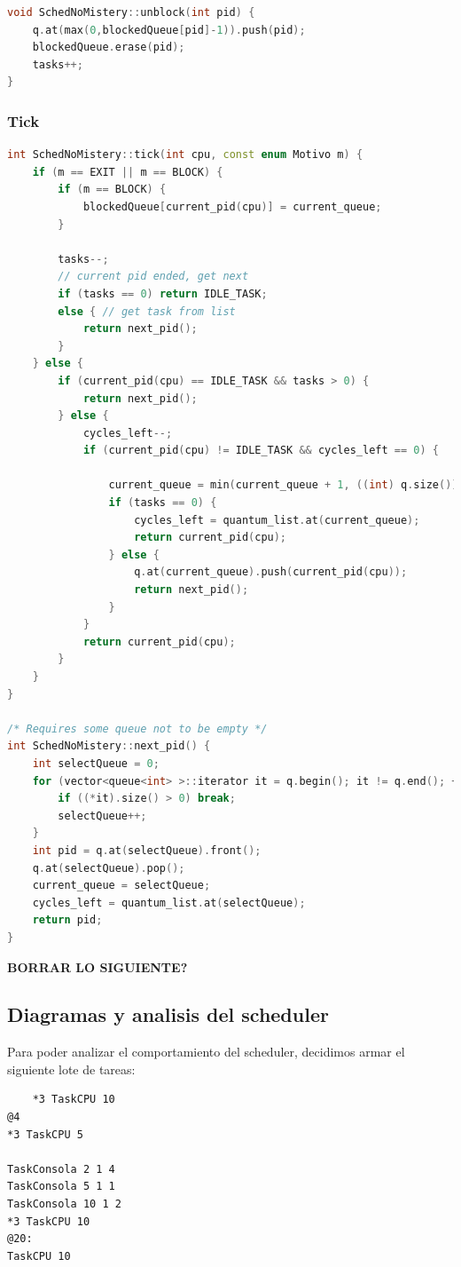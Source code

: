 \begin{lstlisting}[language=C++, breaklines=true]
void SchedNoMistery::unblock(int pid) {
	q.at(max(0,blockedQueue[pid]-1)).push(pid);
	blockedQueue.erase(pid);
	tasks++;
}
\end{lstlisting}


\subsubsection{Tick}
\begin{lstlisting}[language=C++, breaklines=true]
int SchedNoMistery::tick(int cpu, const enum Motivo m) {
	if (m == EXIT || m == BLOCK) {
		if (m == BLOCK) {
			blockedQueue[current_pid(cpu)] = current_queue;
		}
		
		tasks--;
		// current pid ended, get next
		if (tasks == 0) return IDLE_TASK;
		else { // get task from list
			return next_pid();
		}
	} else {
		if (current_pid(cpu) == IDLE_TASK && tasks > 0) {
			return next_pid();
		} else {
			cycles_left--;
			if (current_pid(cpu) != IDLE_TASK && cycles_left == 0) {

				current_queue = min(current_queue + 1, ((int) q.size()) - 1);
				if (tasks == 0) {
					cycles_left = quantum_list.at(current_queue);
					return current_pid(cpu);
				} else {
					q.at(current_queue).push(current_pid(cpu));
					return next_pid();
				}
			}
			return current_pid(cpu);
		}
	}
}

/* Requires some queue not to be empty */
int SchedNoMistery::next_pid() {
	int selectQueue = 0;
	for (vector<queue<int> >::iterator it = q.begin(); it != q.end(); ++it) {
		if ((*it).size() > 0) break;
		selectQueue++;
	}
	int pid = q.at(selectQueue).front();
	q.at(selectQueue).pop();
	current_queue = selectQueue;
	cycles_left = quantum_list.at(selectQueue);
	return pid;
}

\end{lstlisting}

\pagebreak

\textbf{BORRAR LO SIGUIENTE?}

\subsection{Diagramas y analisis del scheduler}
Para poder analizar el comportamiento del scheduler, decidimos armar el siguiente lote de tareas:

\begin{lstlisting}
	*3 TaskCPU 10
@4
*3 TaskCPU 5

TaskConsola 2 1 4
TaskConsola 5 1 1
TaskConsola 10 1 2
*3 TaskCPU 10
@20:
TaskCPU 10
\end{lstlisting}


